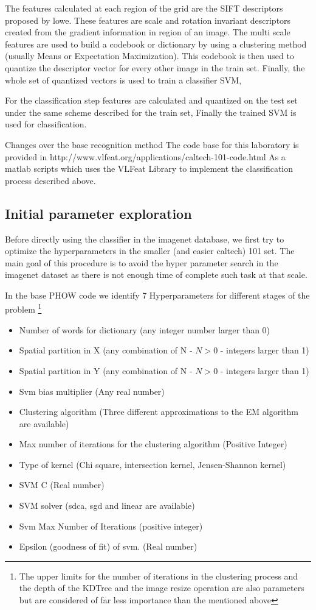 \documentclass[10pt,twocolumn,letterpaper]{article}
\begin{document}
The features calculated at each region of the grid are the SIFT descriptors proposed by lowe. These features are scale and rotation invariant descriptors created from the gradient information in region of an image. The multi scale features are used to build a codebook or dictionary by using a clustering method (usually Means or Expectation Maximization). This codebook is then used to quantize the descriptor vector for every other image in the train set. Finally, the whole set of quantized vectors is used to train a classifier SVM,

For the classification step features are calculated and quantized on the test set under the same scheme described for the train set, Finally the trained SVM is used for classification.
 
Changes over the base recognition method
The code base for this laboratory is provided in http://www.vlfeat.org/applications/caltech-101-code.html  As a matlab scripts which uses the VLFeat Library to implement the classification process described above.

\subsection{Initial parameter exploration}
Before directly using the classifier in the imagenet database, we first try to optimize the hyperparameters in the smaller (and easier caltech) 101 set. The main goal of this procedure is to avoid the hyper parameter search in the imagenet dataset as there is not enough time of complete such task at that scale.

In the base PHOW code we identify 7 Hyperparameters for different stages of the problem \footnote{The upper limits for the number of iterations in the clustering process and the depth of the KDTree and the image resize operation are also parameters but are considered of far less importance than the mentioned above}
\begin{itemize}
	\item Number of words for dictionary (any integer number larger than 0)
	\item Spatial partition in X  (any combination of N - $N > 0$ - integers larger than 1)
	\item Spatial partition in Y  (any combination of N - $N > 0$ - integers larger than 1)
	\item Svm bias multiplier (Any real number)
	\item Clustering algorithm  (Three different approximations to the EM algorithm are available)
	\item Max number of iterations for the clustering algorithm (Positive Integer)
	\item Type of kernel (Chi square, intersection  kernel, Jensen-Shannon kernel)
	\item SVM C (Real number)
	\item SVM solver (sdca, sgd and linear are available) 
	\item Svm Max Number of Iterations (positive integer)
	\item Epsilon (goodness of fit) of svm. (Real number)
\end{itemize}
\end{document}
